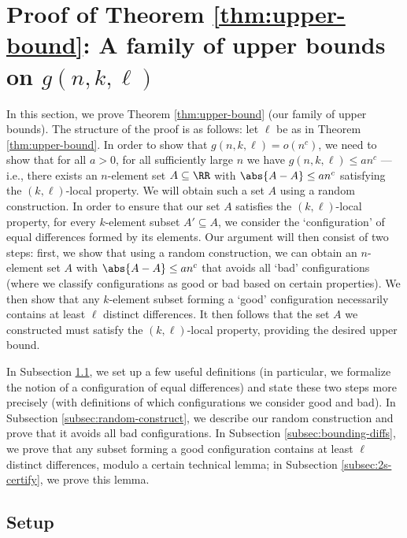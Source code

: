 \section{Proof of Theorem \ref{thm:upper-bound}: A family of upper bounds on \texorpdfstring{$g(n, k, \ell)$}{g(n, k, l)}} \label{sec:upper-bound}

In this section, we prove Theorem \ref{thm:upper-bound} (our family of upper bounds). The structure of the proof is as follows: let $\ell$ be as in Theorem \ref{thm:upper-bound}. In order to show that $g(n, k, \ell) = o(n^c)$, we need to show that for all $a > 0$, for all sufficiently large $n$ we have $g(n, k, \ell) \leq an^c$ --- i.e., there exists an $n$-element set $A \subseteq \RR$ with $\abs{A - A} \leq an^c$ satisfying the $(k, \ell)$-local property. We will obtain such a set $A$ using a random construction. In order to ensure that our set $A$ satisfies the $(k, \ell)$-local property, for every $k$-element subset $A' \subseteq A$, we consider the `configuration' of equal differences formed by its elements. Our argument will then consist of two steps: first, we show that using a random construction, we can obtain an $n$-element set $A$ with $\abs{A - A} \leq an^c$ that avoids all `bad' configurations (where we classify configurations as good or bad based on certain properties). We then show that any $k$-element subset forming a `good' configuration necessarily contains at least $\ell$ distinct differences. It then follows that the set $A$ we constructed must satisfy the $(k, \ell)$-local property, providing the desired upper bound. 

In Subsection \ref{subsec:setup}, we set up a few useful definitions (in particular, we formalize the notion of a configuration of equal differences) and state these two steps more precisely (with definitions of which configurations we consider good and bad). In Subsection \ref{subsec:random-construct}, we describe our random construction and prove that it avoids all bad configurations. In Subsection \ref{subsec:bounding-diffs}, we prove that any subset forming a good configuration contains at least $\ell$ distinct differences, modulo a certain technical lemma; in Subsection \ref{subsec:2s-certify}, we prove this lemma. 

\subsection{Setup} \label{subsec:setup} 

